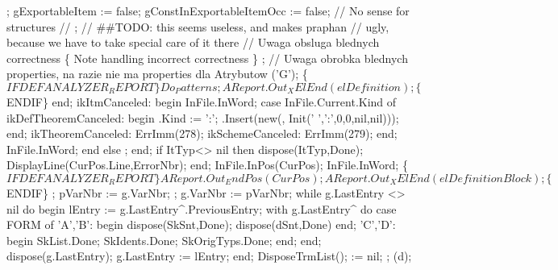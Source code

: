             ;
            gExportableItem := false;
            gConstInExportableItemOcc := false;
            // No sense for structures
            //     ;
            // ##TODO: this  seems useless, and makes praphan
            //         ugly, because we have to take special care of it there
            //   Uwaga obsluga blednych correctness
            \{ Note handling incorrect correctness \}
            ;
            //   Uwaga obrobka blednych properties, na razie nie ma properties dla Atrybutow
            ('G');
            \{$IFDEF ANALYZER_REPORT\}
            Do_Patterns;
            AReport.Out_XElEnd(elDefinition);
            \{$ENDIF\}
         end;
      ikItmCanceled:
         begin
            InFile.InWord;
            case InFile.Current.Kind of
               ikDefTheoremCanceled:
                  begin
                     .Kind := ':';
                     .Insert(new(, Init(' ',':',0,0,nil,nil)));
                  end;
               ikTheoremCanceled:
                  ErrImm(278);
               ikSchemeCanceled:
                  ErrImm(279);
            end;
            InFile.InWord;
         end
   else ;
   end;
   if ItTyp<> nil then dispose(ItTyp,Done);
   DisplayLine(CurPos.Line,ErrorNbr);
   end;
   InFile.InPos(CurPos); InFile.InWord;
   \{$IFDEF ANALYZER_REPORT\}
   AReport.Out_EndPos(CurPos);
   AReport.Out_XElEnd(elDefinitionBlock);
   \{$ENDIF\}
   ;
   pVarNbr := g.VarNbr;
   ;
   g.VarNbr := pVarNbr;
   while g.LastEntry <> nil do
   begin
      lEntry := g.LastEntry^.PreviousEntry;
      with g.LastEntry^ do
         case FORM of
            'A','B': begin dispose(SkSnt,Done); dispose(dSnt,Done) end;
            'C','D': begin SkList.Done; SkIdents.Done; SkOrigTyps.Done; end;
         end;
      dispose(g.LastEntry);
      g.LastEntry := lEntry;
   end;
   DisposeTrmList();  := nil;
   ;
   (d);
